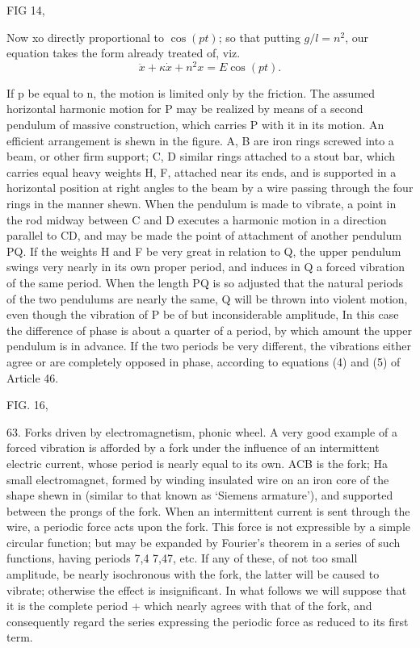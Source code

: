 FIG 14,

Now xo directly proportional to \(\cos(pt)\); so that putting \(g/l =n^2\), our
equation takes the form already treated of, viz.
\[ \ddot{x} + \kappa \dot{x} + n^2 x = E \cos(pt).  \]

If p be equal to n, the motion is limited only by the friction. The assumed
horizontal harmonic motion for P may be realized by means of a second pendulum
of massive construction, which carries P with it in its motion. An efficient
arrangement is shewn in the figure. A, B are iron rings screwed into a beam, or
other firm support; C, D similar rings attached to a stout bar, which carries
equal heavy weights H, F, attached near its ends, and is supported in a
horizontal position at right angles to the beam by a wire passing through the
four rings in the manner shewn. When the pendulum is made to vibrate, a point
in the rod midway between C and D executes a harmonic motion in a direction
parallel to CD, and may be made the point of attachment of another pendulum PQ.
If the weights H and F be very great in relation to Q, the upper pendulum
swings very nearly in its own proper period, and induces in Q a forced
vibration of the same period.  When the length PQ is so adjusted that the
natural periods of the two pendulums are nearly the same, Q will be thrown into
violent motion, even though the vibration of P be of but inconsiderable
amplitude, In this case the difference of phase is about a quarter of a period,
by which amount the upper pendulum is in advance. If the two periods be very
different, the vibrations either agree or are completely opposed in phase,
according to equations (4) and (5) of Article 46.

FIG. 16,

63.  Forks driven by electromagnetism, phonic wheel.
A very good example of a forced vibration is afforded by a fork under the
influence of an intermittent electric current, whose period is nearly equal to
its own. ACB is the fork; Ha small electromagnet, formed by winding insulated
wire on an iron core of the shape shewn in (similar to that known as `Siemens
armature'), and supported between the prongs of the fork. When an intermittent
current is sent through the wire, a periodic force acts upon the fork. This
force is not expressible by a simple circular function; but may be expanded by
Fourier's theorem in a series of such functions, having periods 7,4 7,47, etc.
If any of these, of not too small amplitude, be nearly isochronous with the
fork, the latter will be caused to vibrate; otherwise the effect is
insignificant. In what follows we will suppose that it is the complete period +
which nearly agrees with that of the fork, and consequently regard the series
expressing the periodic force as reduced to its first term.

